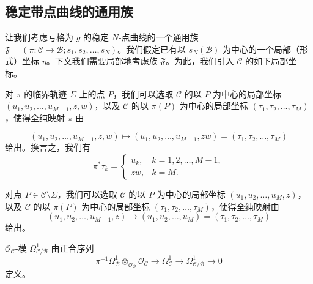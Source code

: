 \subsection{稳定带点曲线的通用族}

让我们考虑亏格为 $g$ 的稳定 $N$-点曲线的一个通用族
$\mathfrak{F}=(\pi:\mathcal{C}\to\mathcal{B};s_1,s_2,\dots,s_N)$。我们假定已有以
$s_N(\mathcal{B})$ 为中心的一个局部（形式）坐标 $\eta$。下文我们需要局部地考虑族
$\mathfrak{F}$。为此，我们引入 $\mathcal{C}$ 的如下局部坐标。

\begin{sloppypar}对 $\pi$ 的临界轨迹 $\Sigma$ 上的点 $P$，我们可以选取 $\mathcal{C}$ 的以 $P$
为中心的局部坐标 $(u_1,u_2,\dots,u_{M-1},z,w)$，以及 $\mathcal{C}$ 的以 $\pi(P)$
为中心的局部坐标 $(\tau_1,\tau_2,\dots,\tau_M)$，使得全纯映射 $\pi$ 由
\end{sloppypar}
\[
(u_1,u_2,\dots,u_{M-1},z,w)\longmapsto
(u_1,u_2,\dots,u_{M-1},zw)=(\tau_1,\tau_2,\dots,\tau_M)
\]
给出。换言之，我们有
\[
\pi^*\tau_k=
\begin{cases}
u_k, & k=1,2,\dots,M-1,\\
zw, & k=M.
\end{cases}
\]

对点 $P\in\mathcal{C}\setminus\Sigma$，我们可以选取 $\mathcal{C}$ 的以 $P$
为中心的局部坐标 $(u_1,u_2,\dots,u_M,z)$，以及 $\mathcal{C}$ 的以 $\pi(P)$
为中心的局部坐标 $(\tau_1,\tau_2,\dots,\tau_M)$，使得全纯映射由
\[
(u_1,u_2,\dots,u_{M-1},z)\longmapsto
(u_1,u_2,\dots,u_M)=(\tau_1,\tau_2,\dots,\tau_M)
\]
给出。

$\mathcal{O}_{\mathcal{C}}$-模 $\Omega^1_{\mathcal{C}/\mathcal{B}}$ 由正合序列
\[
\pi^{-1}\Omega^1_{\mathcal{B}}\otimes_{\mathcal{O}_{\mathcal{B}}}
\mathcal{O}_{\mathcal{C}}\to\Omega^1_{\mathcal{C}}\to
\Omega^1_{\mathcal{C}/\mathcal{B}}\to 0
\]
定义。

